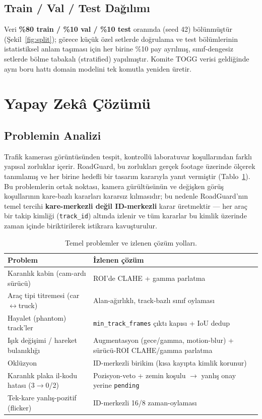 \documentclass[12pt,a4paper]{article}
\newcommand{\tcode}[1]{\texttt{\small #1}}
\begin{document}
\subsection{Train / Val / Test Dağılımı}
Veri \textbf{\%80 train / \%10 val / \%10 test} oranında (seed 42) bölünmüştür (Şekil~\ref{fig:split});
görece küçük özel setlerde doğrulama ve test bölümlerinin istatistiksel anlam taşıması için her birine
\%10 pay ayrılmış, sınıf-dengesiz setlerde bölme tabakalı (stratified) yapılmıştır. Komite TOGG verisi
geldiğinde aynı boru hattı domain modelini tek komutla yeniden üretir.

\section{Yapay Zekâ Çözümü}

\subsection{Problemin Analizi}
Trafik kamerası görüntüsünden tespit, kontrollü laboratuvar koşullarından farklı yapısal zorluklar
içerir. RoadGuard, bu zorlukları gerçek footage üzerinde ölçerek tanımlamış ve her birine hedefli bir
tasarım kararıyla yanıt vermiştir (Tablo~\ref{tab:problem}). Bu problemlerin ortak noktası, kamera
gürültüsünün ve değişken görüş koşullarının kare-bazlı kararları kararsız kılmasıdır; bu nedenle
RoadGuard'nın temel tercihi \textbf{kare-merkezli değil ID-merkezli} karar üretmektir — her araç bir
takip kimliği (\tcode{track\_id}) altında izlenir ve tüm kararlar bu kimlik üzerinde zaman içinde
biriktirilerek istikrara kavuşturulur.

\begin{table}[H]\centering\small
\caption{Temel problemler ve izlenen çözüm yolları.}\label{tab:problem}
\begin{tabularx}{\textwidth}{>{\raggedright\arraybackslash}p{4.1cm} >{\raggedright\arraybackslash}X}
\toprule
\textbf{Problem} & \textbf{İzlenen çözüm} \\ \midrule
Karanlık kabin (cam-ardı sürücü) & ROI'de CLAHE + gamma parlatma \\
Araç tipi titremesi (car$\leftrightarrow$truck) & Alan-ağırlıklı, track-bazlı sınıf oylaması \\
Hayalet (phantom) track'ler & \tcode{min\_track\_frames} çıktı kapısı + IoU dedup \\
Işık değişimi / hareket bulanıklığı & Augmentasyon (gece/gamma, motion-blur) + sürücü-ROI CLAHE/gamma parlatma \\
Oklüzyon & ID-merkezli birikim (kısa kayıpta kimlik korunur) \\
Karanlık plaka il-kodu hatası (3$\rightarrow$0/2) & Pozisyon-veto + zemin koşulu $\rightarrow$ yanlış onay yerine \tcode{pending} \\
Tek-kare yanlış-pozitif (flicker) & ID-merkezli 16/8 zaman-oylaması \\
\bottomrule
\end{tabularx}
\end{table}
\end{document}
